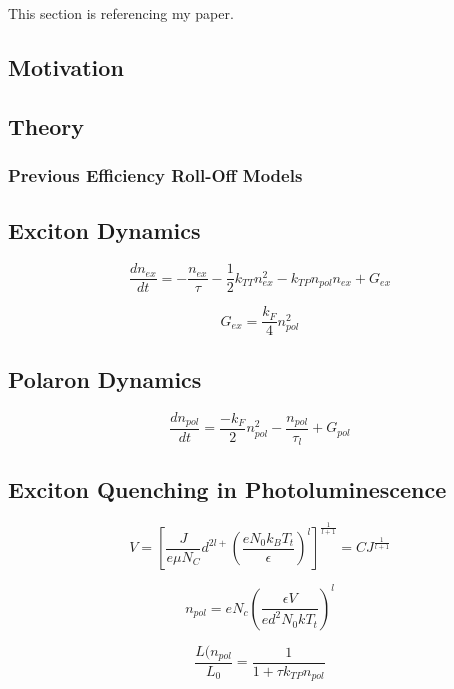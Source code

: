 \documentclass[../thesis.tex]{subfiles}
\begin{document}
This section is referencing my paper.\cite{Hershey2016,Hershey2017}
\subsection{Motivation}
\subsection{Theory}
\subsubsection{Previous Efficiency Roll-Off Models}
\subsection{Exciton Dynamics}
\begin{equation}
\frac{dn_{ex}}{dt} = - \frac{n_{ex}}{\tau}-\frac{1}{2}k_{TT}n_{ex}^2-k_{TP}n_{pol}n_{ex}+G_{ex}
\label{eqn:exciton_rate}
\end{equation}

\begin{equation}
G_{ex}=\frac{k_F}{4}n_{pol}^2
\label{eqn:exciton_formation}
\end{equation}


\subsection{Polaron Dynamics}

\begin{equation}
\frac{dn_{pol}}{dt}=\frac{-k_F}{2}n_{pol}^2-\frac{n_{pol}}{\tau_l}+G_{pol}
\label{eqn:polaron_rate}
\end{equation}

\subsection{Exciton Quenching in Photoluminescence}

\begin{equation}
V=\left[ \frac{J}{e\mu N_C}d^{2l+}\left( \frac{eN_0k_BT_t}{\epsilon} \right)^l \right]^{\frac{1}{l+1}}=CJ^{\frac{1}{l+1}}
\label{eqn:ktpVoltage}
\end{equation}

\begin{equation}
n_{pol}=eN_c\left(\frac{\epsilon V}{ed^2N_0kT_t}\right)^l
\label{eqn:kptDensity}
\end{equation}

\begin{equation}
\frac{L(n_{pol}}{L_0}=\frac{1}{1+\tau k_{TP}n_{pol}}
\label{eqn:ktpFit}
\end{equation}
\end{document}
